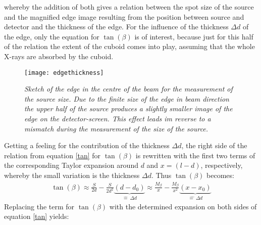 whereby the addition of both gives a relation between the spot size of the source and the magnified edge image resulting from the position between source and detector and the thickness of the edge. For the influence of the thickness $\Delta d$ of the edge, only the equation for $\tan(\beta)$ is of interest, because just for this half of the relation the extent of the cuboid comes into play, assuming that the whole X-rays are absorbed by the cuboid. \begin{figure}[h]
	\begin{center}
		\texttt{[image: edgethickness]}
	\end{center}
	\caption[Drawing of the edge in the centre of the beam for the measurement of the source size]{\textit{Sketch of the edge in the centre of the beam for the measurement of the source size. Due to the finite size of the edge in beam direction the upper half of the source produces a slightly smaller image of the edge on the detector-screen. This effect leads im reverse to a mismatch during the measurement of the size of the source.}}
	\label{knife}
\end{figure}
\clearpage
Getting a feeling for the contribution of the thickness $\Delta d$, the right side of the relation from equation \ref{tan} for $\tan(\beta)$ is rewritten with the first two terms of the corresponding Taylor expansion around $d$ and $x = (l-d)$, respectively, whereby the small variation is the thickness $\Delta d$. Thus $\tan(\beta)$ becomes:
\begin{equation}\label{taylor}
\begin{aligned}
\tan(\beta) \approx \frac{S}{2d} -\frac{S}{2d^{2}} \underbrace{\left(d-d_{0}\right)}_{\hat{=}\ \Delta d} 
\approx \frac{M_{\beta}}{x} - \frac{M_{\beta}}{x^{2}} \underbrace{\left(x -x_{0}\right)}_{\hat{=\ }\Delta d} 
\end{aligned}
\end{equation}
Replacing the term for $\tan(\beta)$ with the determined expansion on both sides of equation \ref{tan} yields:
